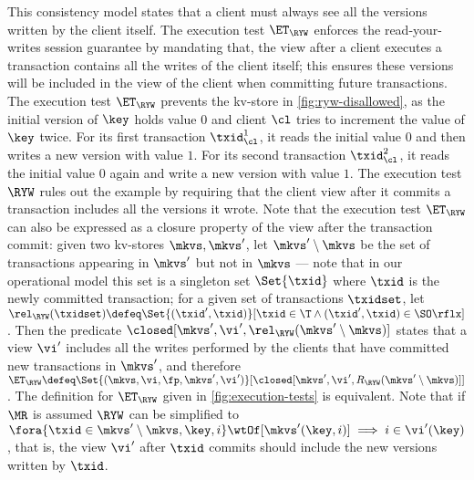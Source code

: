 This consistency model states that a client must always see all the versions written by the client itself. 
The execution test $\ET_{\RYW}$ enforces the read-your-writes session guarantee by 
mandating that, the view after a client executes a transaction contains all the writes of the client 
itself; this ensures these versions will be included in the view of the client when committing future 
transactions.
The execution test $\ET_{\RYW}$ prevents the kv-store in \cref{fig:ryw-disallowed}, 
as the initial version of $\key$ holds value $0$ 
and client $\cl$ tries to increment the value of $\key$ twice.  
For its first transaction \( \txid_{\cl}^1\), it reads the initial value $0$ and then writes a new version with value $1$. 
For its second transaction \( \txid_{\cl}^2\), it reads the initial value $0$ again and write a new version with value $1$.
The execution test $\RYW$ rules out the example by requiring that
the client view after it commits a transaction includes all the versions it wrote.  
Note that the execution test $\ET_{\RYW}$ can also be expressed 
as a closure property of the view after the transaction commit: given 
two kv-stores $\mkvs, \mkvs'$, let  
$\mkvs' \setminus \mkvs$ be the set of transactions appearing 
in $\mkvs'$ but not in $\mkvs$ --- note that 
in our operational model this set is a singleton set $\Set{\txid}$ where $\txid$ is the newly committed transaction;
for a given set of transactions $\txidset$, let $\rel_{\RYW}(\txidset) \defeq \Set{(\txid', \txid) }[ \txid \in \T \land (\txid', \txid) \in \SO\rflx ]$. 
Then the predicate $\closed[\mkvs', \vi', \rel_{\RYW}(\mkvs' \setminus \mkvs)]$ states that a 
view $\vi'$ includes all the writes performed by the clients that have committed new transactions in $\mkvs'$, 
and therefore $\ET_{\RYW} \defeq \Set{(\mkvs, \vi, \fp, \mkvs', \vi') }[ \closed[\mkvs', \vi', R_{\RYW}(\mkvs' \setminus \mkvs)]]$.
The definition for \( \ET_{\RYW} \) given in \cref{fig:execution-tests} is equivalent.
Note that if \( \MR \) is assumed \( \RYW \) can be simplified to 
\( \fora{\txid \in \mkvs' \setminus \mkvs, \key,i} \wtOf[\mkvs'(\key,i)] \implies i \in \vi'(\key)\),
that is, the view \( \vi' \) after \( \txid \) commits should include the new versions written by \( \txid \).



